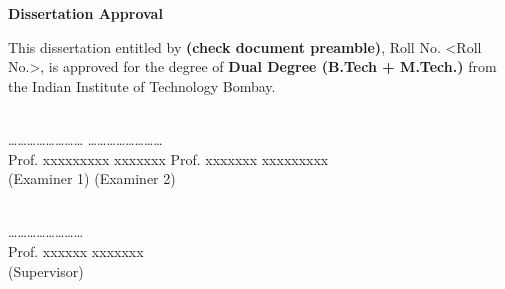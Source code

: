 \documentclass[12pt, a4paper
,openany
]{Thesis} %
\def\dissertationTitle{<Dissertation Title>}
\def\degree{Dual Degree (B.Tech + M.Tech.)}
\def\authornames{<Your Name> (check document preamble)}
\def\authorrollno{<Roll No.>}
\newcommand\myemptypage{
    \newpage
    \null
    \pagestyle{empty}
    \newpage
    \pagestyle{plain}
    }
\begin{document}


\thispagestyle{empty} %

\vspace{-1in}
\begin{center}
{\LARGE  {\bf Dissertation Approval}}
\end{center}
\vspace*{0.1in} \noindent This dissertation entitled {\large \bf \dissertationTitle} by {\bf \large \authornames}, Roll No. \authorrollno, is approved for the degree of  {\large \bf \degree} from the Indian Institute of Technology Bombay.\\\\

\vspace{2cm}

  \hspace*{0.8cm}\ldots\ldots \ldots\ldots \ldots\ldots \ldots\ldots  \hspace{2in}  \ldots\ldots \ldots\ldots \ldots\ldots \ldots\ldots \\
  \hspace*{0.4cm}\hspace*{0cm} Prof. xxxxxxxxx xxxxxxx \hspace{1.85in} Prof. xxxxxxx xxxxxxxxx\\
  \hspace*{0.8cm}\hspace*{0.9cm} (Examiner 1) \hspace{2.8in} (Examiner 2)\\\\

\vspace{2cm}

  \hspace*{0.8cm}\ldots\ldots \ldots\ldots \ldots\ldots \ldots\ldots
  \\
  \hspace*{0.8cm}\hspace*{0cm} Prof. xxxxxx xxxxxxx 
  \\
  \hspace*{0.8cm}\hspace*{0.9cm} (Supervisor) 
  \\\\
\end{document}
